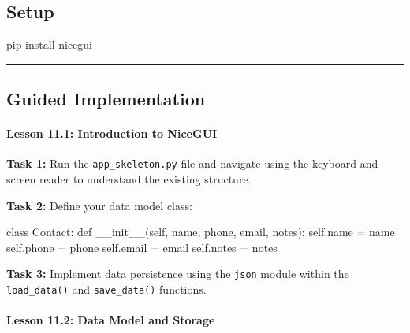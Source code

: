 \documentclass[
  justified,
  openright,
]{tufte-book}
\let\subsubsection\paragraph
\let\paragraph\paragraph
\newcommand{\ExtensionTok}[1]{#1}
\newcommand{\FunctionTok}[1]{\textcolor{BrandBlue}{#1}}
\newcommand{\KeywordTok}[1]{\textcolor{BrandBlue}{#1}}
\newcommand{\NormalTok}[1]{#1}
\newcommand{\OperatorTok}[1]{\textcolor{DarkGray}{#1}}
\newcommand{\VariableTok}[1]{#1}
\newenvironment{Shaded}{%
  \begin{snugshade}
}{%
  \end{snugshade}
}
\let\subsubsection\paragraph
\let\paragraph\paragraph
\begin{document}
\subsection{Setup}\label{setup}

\begin{Shaded}
\begin{Highlighting}[]
\ExtensionTok{pip}\NormalTok{ install nicegui}
\end{Highlighting}
\end{Shaded}

\begin{center}\rule{0.5\linewidth}{0.5pt}\end{center}

\subsection{Guided Implementation}\label{guided-implementation}

\subsubsection{Lesson 11.1: Introduction to
NiceGUI}\label{lesson-11.1-introduction-to-nicegui}

\textbf{Task 1:} Run the \texttt{app\_skeleton.py} file and navigate
using the keyboard and screen reader to understand the existing
structure.

\textbf{Task 2:} Define your data model class:

\begin{Shaded}
\begin{Highlighting}[]
\KeywordTok{class}\NormalTok{ Contact:}
    \KeywordTok{def} \FunctionTok{\_\_init\_\_}\NormalTok{(}\VariableTok{self}\NormalTok{, name, phone, email, notes):}
        \VariableTok{self}\NormalTok{.name }\OperatorTok{=}\NormalTok{ name}
        \VariableTok{self}\NormalTok{.phone }\OperatorTok{=}\NormalTok{ phone}
        \VariableTok{self}\NormalTok{.email }\OperatorTok{=}\NormalTok{ email}
        \VariableTok{self}\NormalTok{.notes }\OperatorTok{=}\NormalTok{ notes}
\end{Highlighting}
\end{Shaded}

\textbf{Task 3:} Implement data persistence using the \texttt{json}
module within the \texttt{load\_data()} and \texttt{save\_data()}
functions.

\subsubsection{Lesson 11.2: Data Model and
Storage}\label{lesson-11.2-data-model-and-storage}
\end{document}
